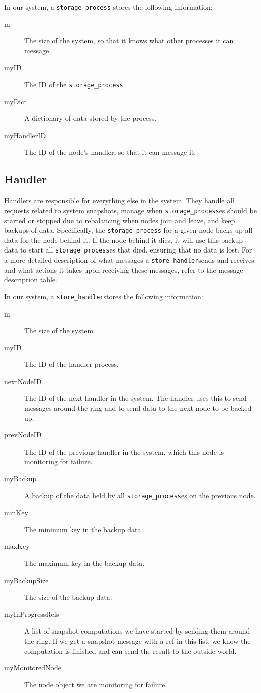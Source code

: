 \documentclass[12pt,letterpaper]{article}
\renewcommand{\tt}[1]{\texttt{#1}}
\newcommand{\sh}{\tt{store\_handler}}
\renewcommand{\sp}{\tt{storage\_process}}
\begin{document}
In our system, a \sp{} stores the following information:
\begin{description}
\item [m] The size of the system, so that it knows what other processes it can message.
\item [myID] The ID of the \sp.
\item [myDict] A dictionary of data stored by the process.
\item [myHandlerID] The ID of the node's handler, so that it can message it.
\end{description}

\subsection*{Handler}

Handlers are responsible for everything else in the system. They handle all requests related to system snapshots, manage when \sp es should be started or stopped due to rebalancing when nodes join and leave, and keep backups of data. Specifically, the \sp{} for a given node backs up all data for the node behind it. If the node behind it dies, it will use this backup data to start all \sp es that died, ensuring that no data is lost. For a more detailed description of what messages a \sh sends and receives and what actions it takes upon receiving these messages, refer to the message description table.

In our system, a \sh stores the following information:
\begin{description}
\item [m] The size of the system.
\item [myID] The ID of the handler process.
\item [nextNodeID] The ID of the next handler in the system. The handler uses this to send messages around the ring and to send data to the next node to be backed up.
\item [prevNodeID] The ID of the previous handler in the system, which this node is monitoring for failure.
\item [myBackup] A backup of the data held by all \sp es on the previous node.
\item [minKey] The minimum key in the backup data.
\item [maxKey] The maximum key in the backup data.
\item [myBackupSize] The size of the backup data.
\item [myInProgressRefs] A list of snapshot computations we have started by sending them around the ring. If we get a snapshot message with a ref in this list, we know the computation is finished and can send the result to the outside world.
\item [myMonitoredNode] The node object we are monitoring for failure.
\end{description}
\end{document}
